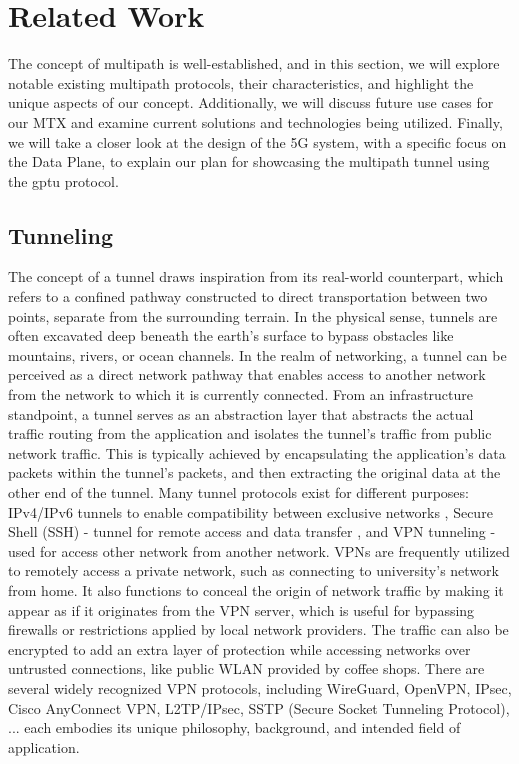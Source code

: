\cleardoublepage\chapter{Related Work}\label{sec:related_work}\minitoc\vspace{.5cm}

The concept of multipath is well-established, and in this section, we will explore notable existing multipath protocols, their characteristics, and highlight the unique aspects of our concept. 
Additionally, we will discuss future use cases for our \ac{MTX} and examine current solutions and technologies being utilized. 
Finally, we will take a closer look at the design of the 5G system, with a specific focus on the Data Plane, to explain our plan for showcasing the multipath tunnel using the \ac{gptu} protocol.

\section{Tunneling}
The concept of a tunnel draws inspiration from its real-world counterpart, which refers to a confined pathway constructed to direct transportation between two points, separate from the surrounding terrain. 
In the physical sense, tunnels are often excavated deep beneath the earth's surface to bypass obstacles like mountains, rivers, or ocean channels.
In the realm of networking, a tunnel can be perceived as a direct network pathway that enables access to another network from the network to which it is currently connected. 
From an infrastructure standpoint, a tunnel serves as an abstraction layer that abstracts the actual traffic routing from the application and isolates the tunnel's traffic from public network traffic. 
This is typically achieved by encapsulating the application's data packets within the tunnel's packets, and then extracting the original data at the other end of the tunnel.
Many tunnel protocols exist for different purposes: IPv4/IPv6 tunnels to enable compatibility between exclusive networks \cite{rfc4380_Teredo_ipv6_tunnel_udp}, Secure Shell (SSH) - tunnel for remote access and data transfer \cite{rfc4251_ssh_protocol}, and \ac{VPN} tunneling - used for access other network from another network. 
\ac{VPN}s are frequently utilized to remotely access a private network, such as connecting to university's network from home. 
It also functions to conceal the origin of network traffic by making it appear as if it originates from the VPN server, which is useful for bypassing firewalls or restrictions applied by local network providers.
The traffic can also be encrypted to add an extra layer of protection while accessing networks over untrusted connections, like public WLAN provided by coffee shops.
There are several widely recognized VPN protocols, including WireGuard, OpenVPN, IPsec, Cisco AnyConnect VPN, L2TP/IPsec, SSTP (Secure Socket Tunneling Protocol), ... each embodies its unique philosophy, background, and intended field of application.


